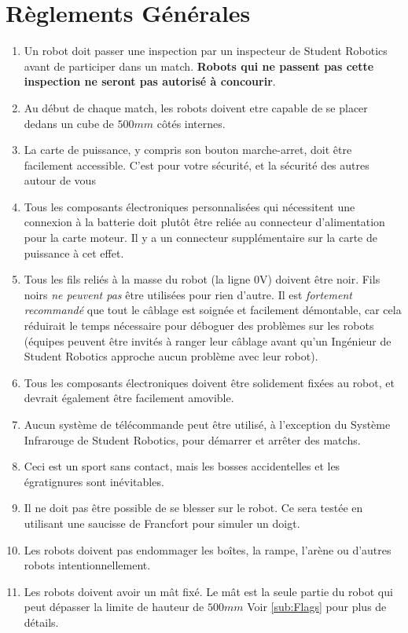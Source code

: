 \section {Règlements Générales}
\label{sec:Regulations}

\begin{enumerate}
\item Un robot doit passer une inspection par un inspecteur de Student Robotics avant de participer dans un match.
 \textbf{Robots qui ne passent pas cette inspection ne seront pas autorisé à concourir}.
\item Au début de chaque match, les robots doivent etre capable de se placer dedans un cube de $500mm$ côtés internes.
\item La carte de puissance, y compris son bouton marche-arret, doit être facilement accessible.
 C'est pour votre sécurité, et la sécurité des autres autour de vous
\item Tous les composants électroniques personnalisées qui nécessitent une connexion à la batterie  doit plutôt être reliée au connecteur d'alimentation pour la carte moteur.
 Il y a un connecteur supplémentaire sur la carte de puissance à cet effet.
\item Tous les fils reliés à la masse du robot (la ligne 0V) doivent être noir.
 Fils noirs \emph{ne peuvent pas} être utilisées pour rien d'autre.
 Il est \emph{fortement recommandé} que tout le câblage est soignée et facilement démontable, car cela réduirait le temps nécessaire pour déboguer des problèmes sur les robots 
 (équipes peuvent être invités à ranger leur câblage avant qu'un Ingénieur de Student Robotics approche aucun problème avec leur robot).
\item Tous les composants électroniques doivent être solidement fixées au robot, et devrait également être facilement amovible.
\item Aucun système de télécommande peut être utilisé, à l'exception du Système Infrarouge de Student Robotics, pour démarrer et arrêter des matchs.
\item Ceci est un sport sans contact, mais les bosses accidentelles et les égratignures sont inévitables.
\item Il ne doit pas être possible de se blesser sur le robot.
 Ce sera testée en utilisant une saucisse de Francfort pour simuler un doigt.
\item Les robots doivent pas endommager les boîtes, la rampe, l'arène ou d'autres robots intentionnellement.
\item Les robots doivent avoir un mât fixé. Le mât est la seule partie du robot qui peut dépasser la limite de hauteur de $500mm$  Voir \autoref{sub:Flags} pour plus de détails.

\end{enumerate}
